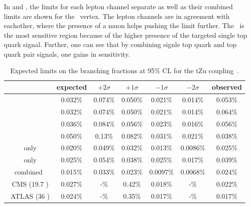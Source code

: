 In  and , the limits for each lepton channel separate as well as their combined limits are shown for the \Zut\ vertex. The lepton channels are in agreement with eachother, where the presence of a muon helps pushing the limit further. The \STSR\ is the most sensitive region because of the higher presence of the targeted single top quark signal. Further, one can see that by combining signle top quark and top quark pair signals, one gains in sensitivity. 
\begin{table}[htbp]
	\centering
	\caption{Expected limits on the branching fractions at 95\% CL for the tZu coupling~\cite{Sirunyan:2017kkr,ATLAS-CONF-2017-070}.}
	\begin{tabular}{ccccccc}
		\toprule
		& expected & $+2\sigma$ & $+1\sigma$ & $-1\sigma$ & $-2\sigma$ & observed \\ 
		\midrule
		\mumumu\ & 0.032\% & 0.074\% & 0.050\% & 0.021\% & 0.014\% & 0.053\% \\ 
	
		\emumu\ & 0.032\% & 0.074\% & 0.050\% & 0.021\% & 0.014\% & 0.064\% \\ 
		
		\eemu\ & 0.036\% & 0.084\% & 0.056\% & 0.023\% & 0.016\% & 0.056\% \\ 
		
		\eee\ & 0.050\% & 0.13\% & 0.082\% & 0.031\% & 0.021\% & 0.038\% \B \\ 
		\hdashline
		\STSR\ only & 0.020\% & 0.049\% & 0.032\% & 0.013\% & 0.0086\% & 0.025\%  \T\\ 
		
		\TTSR\ only & 0.025\% & 0.054\% & 0.038\% & 0.025\% & 0.017\% & 0.039\% \B \\ 
		\hdashline
		combined & 0.015\% & 0.033\% & 0.023\% & 0.0097\% & 0.0068\% & 0.024\%  \T \B\\ 
		\hdashline
		8 \TeV\ CMS (19.7 \fbinv)   &0.027\% & -\%  & 0.42\% & 0.018\% & -\% & 0.022\%  \T\B\\
		\hdashline
		13 \TeV\ ATLAS (36 \fbinv)   & 0.024\% & -\% &   0.35\% & 0.017\%& -\% & 0.017\% \T\\
		
		\bottomrule
	\end{tabular} 
	\label{tab:ResultsTZU}
\end{table}
